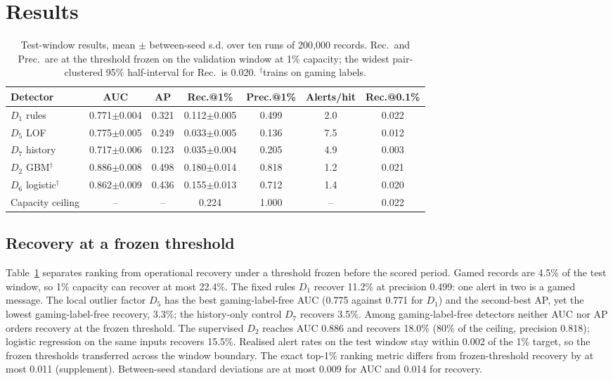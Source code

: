\documentclass[conference]{IEEEtran}
\begin{document}
\section{Results}
\begin{table}[!t]
\caption{Test-window results, mean $\pm$ between-seed s.d. over ten runs of
200{,}000 records. Rec.\ and Prec.\ are at the threshold frozen on the validation
window at 1\% capacity; the widest pair-clustered 95\% half-interval for Rec.\
is 0.020. $^\dagger$trains on gaming labels.}
\label{tab:main}
\centering
\scriptsize
\setlength{\tabcolsep}{2pt}
\begin{tabular}{@{}lcccccc@{}}
\toprule
Detector & AUC & AP & Rec.@1\% & Prec.@1\% & Alerts/hit & Rec.@0.1\% \\
\midrule
$D_1$ rules & 0.771$\pm$0.004 & 0.321 & 0.112$\pm$0.005 & 0.499 & 2.0 & 0.022 \\
$D_5$ LOF & 0.775$\pm$0.005 & 0.249 & 0.033$\pm$0.005 & 0.136 & 7.5 & 0.012 \\
$D_7$ history & 0.717$\pm$0.006 & 0.123 & 0.035$\pm$0.004 & 0.205 & 4.9 & 0.003 \\
$D_2$ GBM$^\dagger$ & 0.886$\pm$0.008 & 0.498 & 0.180$\pm$0.014 & 0.818 & 1.2 & 0.021 \\
$D_6$ logistic$^\dagger$ & 0.862$\pm$0.009 & 0.436 & 0.155$\pm$0.013 & 0.712 & 1.4 & 0.020 \\
\midrule
Capacity ceiling & -- & -- & 0.224 & 1.000 & -- & 0.022 \\
\bottomrule
\end{tabular}
\end{table}

\subsection{Recovery at a frozen threshold}
Table~\ref{tab:main} separates ranking from operational recovery under a
threshold frozen before the scored period. Gamed records are 4.5\% of
the test window, so 1\% capacity can recover at most 22.4\%. The
fixed rules $D_1$ recover 11.2\% at precision 0.499: one
alert in two is a gamed message. The local outlier factor $D_5$ has the best
gaming-label-free AUC (0.775 against 0.771 for $D_1$) and the second-best
AP, yet the lowest gaming-label-free recovery, 3.3\%; the history-only
control $D_7$ recovers 3.5\%. Among gaming-label-free detectors neither
AUC nor AP orders recovery at the frozen threshold. The supervised $D_2$
reaches AUC 0.886 and recovers 18.0\%
(80\% of the ceiling, precision 0.818); logistic
regression on the same inputs recovers 15.5\%. Realised alert
rates on the test window stay within 0.002 of the 1\% target, so the
frozen thresholds transferred across the window boundary. The exact
top-1\% ranking metric differs from frozen-threshold recovery by at most
0.011 (supplement). Between-seed standard deviations are at most
0.009 for AUC and 0.014 for recovery.
\end{document}
